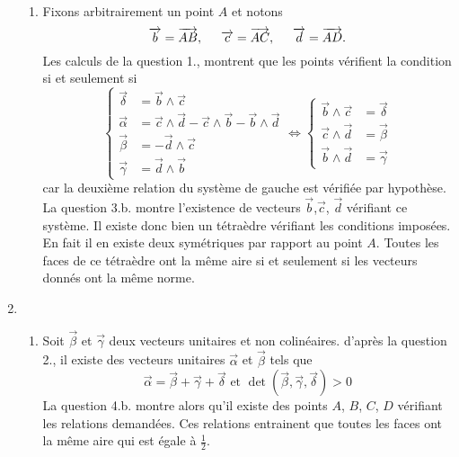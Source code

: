 \begin{enumerate}
\begin{enumerate}
\item Fixons arbitrairement un point $A$ et notons 
\begin{displaymath}
\overrightarrow{b}=\overrightarrow{AB},\hspace{0.5cm} \overrightarrow{c}=\overrightarrow{AC},\hspace{0.5cm} \overrightarrow{d}=\overrightarrow{AD}. 
\end{displaymath}
Les calculs de la question 1., montrent que les points vérifient la condition si et seulement si
\begin{displaymath}
\left\lbrace 
\begin{aligned}
 \overrightarrow{\delta} &= \overrightarrow{b}\wedge \overrightarrow{c}\\ 
\overrightarrow{\alpha} &= \overrightarrow{c}\wedge \overrightarrow{d} -\overrightarrow{c}\wedge \overrightarrow{b} -\overrightarrow{b}\wedge \overrightarrow{d}\\
\overrightarrow{\beta} &= -\overrightarrow{d}\wedge \overrightarrow{c}\\
\overrightarrow{\gamma} &= \overrightarrow{d}\wedge \overrightarrow{b}
\end{aligned}
\right.
\Leftrightarrow
\left\lbrace  
\begin{aligned}
 \overrightarrow{b}\wedge \overrightarrow{c} &= \overrightarrow{\delta} \\
 \overrightarrow{c}\wedge \overrightarrow{d} &= \overrightarrow{\beta} \\
 \overrightarrow{b}\wedge \overrightarrow{d} &= \overrightarrow{\gamma}
\end{aligned}
\right.  
\end{displaymath}
car la deuxième relation du système de gauche est vérifiée par hypothèse. La question 3.b. montre l'existence de vecteurs $\overrightarrow{b}$,$\overrightarrow{c}$, $\overrightarrow{d}$ vérifiant ce système. Il existe donc bien un tétraèdre vérifiant les conditions imposées. En fait il en existe deux symétriques par rapport au point $A$.\newline
Toutes les faces de ce tétraèdre ont la même aire si et seulement si les vecteurs donnés ont la même norme.
\end{enumerate}

\item
\begin{enumerate}
 \item Soit $\overrightarrow \beta$ et $\overrightarrow \gamma$ deux vecteurs unitaires et non colinéaires. d'après la question 2., il existe des vecteurs unitaires $\overrightarrow \alpha$ et $\overrightarrow \beta$ tels que
\begin{displaymath}
  \overrightarrow \alpha = \overrightarrow \beta + \overrightarrow \gamma + \overrightarrow \delta 
\text{ et }
\det(\overrightarrow{\beta},\overrightarrow{\gamma},\overrightarrow{\delta}) > 0
\end{displaymath}
La question 4.b. montre alors qu'il existe des points $A$, $B$, $C$, $D$ vérifiant les relations demandées. Ces relations entrainent que toutes les faces ont la même aire qui est égale à $\frac{1}{2}$.


\end{enumerate}
\end{enumerate}

